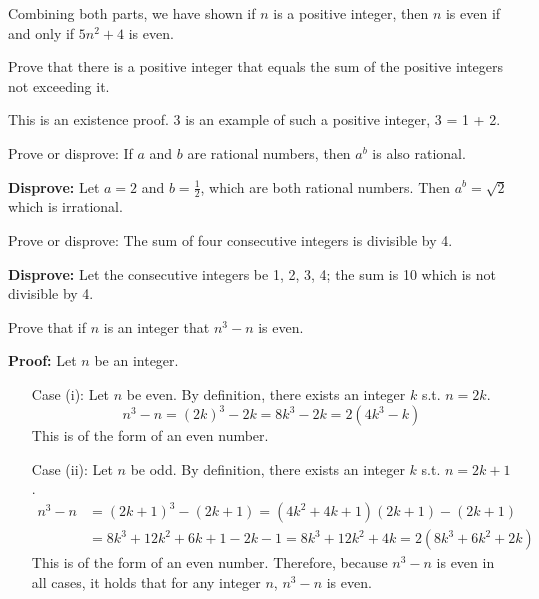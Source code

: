\documentclass[11pt,addpoints]{exam}
\begin{document}
\begin{questions}
\begin{solution}
    \smallskip
    Combining both parts, we have shown if $n$ is a positive integer,
    then $n$ is even if and only if $5n^2+4$ is even.
\end{solution}


\question[2] Prove that there is a positive integer that equals the
sum of the positive integers not exceeding it.
    \ifprintanswers
        \vspace{-10pt}
    \fi
\begin{solution}
    This is an existence proof.  3 is an example of such a positive
    integer, 3 = 1 + 2.
\end{solution}


\question[3] Prove or disprove: If $a$ and $b$ are rational
numbers, then $a^b$ is also rational.
    \ifprintanswers
        \vspace{-10pt}
    \fi
\begin{solution}
    \textbf{Disprove:} Let $a=2$ and $b=\frac{1}{2}$, which are both rational numbers.  Then $a^b =
    \sqrt{2}$ which is irrational.
\end{solution}


\question[3] Prove or disprove: The sum of four consecutive integers is divisible by 4.
    \ifprintanswers
        \vspace{-10pt}
    \fi
\begin{solution}
    \textbf{Disprove:} Let the consecutive integers be 1, 2, 3, 4; the sum is 10 which is not divisible by 4.
\end{solution}


\question[12] Prove that if $n$ is an integer that $n^3 - n$ is even.
    \ifprintanswers
        \vspace{-10pt}
    \fi
\begin{solution} \textbf{Proof:} Let $n$ be an integer.
    \begin{itemize}[itemsep=0pt,parsep=0pt,topsep=0pt,partopsep=0pt]
        \item[Case] (i): Let $n$ be even. By definition, there exists an integer $k$ s.t. $n=2k$.
            \[ n^3 - n = (2k)^3 - 2k = 8k^3 - 2k = 2(4k^3 - k) \]
        This is of the form of an even number.
        \item[Case] (ii):  Let $n$ be odd.  By definition, there exists an integer $k$ s.t. $n = 2k+1$.
            \begin{align*}
                n^3 - n &= (2k+1)^3 - (2k+1) = (4k^2 + 4k+ 1)(2k + 1) - (2k+1) \\
                &= 8k^3 + 12k^2 + 6k + 1 - 2k - 1 = 8k^3 + 12k^2 + 4k = 2(8k^3 + 6k^2 + 2k)
            \end{align*}
        This is of the form of an even number.
        Therefore, because $n^3 - n$ is even in all cases, it holds that for any integer $n$, $n^3 - n$ is even.
    \end{itemize}
\end{solution}


\end{questions}
\end{document}
